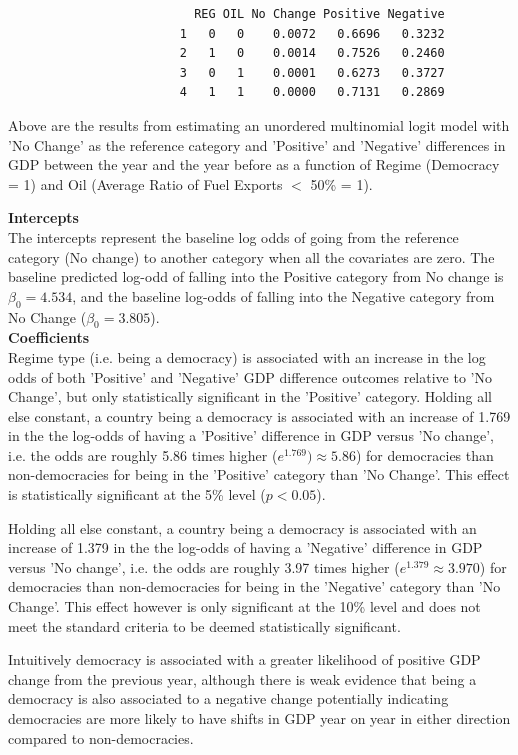 \documentclass[12pt,letterpaper]{article}
\begin{document}
\begin{enumerate}
			
		\begin{verbatim} 
						  REG OIL No Change Positive Negative
						1   0   0    0.0072   0.6696   0.3232
						2   1   0    0.0014   0.7526   0.2460
						3   0   1    0.0001   0.6273   0.3727
						4   1   1    0.0000   0.7131   0.2869
		\end{verbatim}
			
		Above are the results from estimating an unordered multinomial logit model with 'No Change' as the reference category and 'Positive' and 'Negative' differences in GDP between the year and the year before as a function of Regime (Democracy = 1) and Oil (Average Ratio of Fuel Exports $<$ 50\% = 1).
		
		\textbf{Intercepts} \\
		The intercepts represent the baseline log odds of going from the reference category (No change) to another category when all the covariates are zero. The baseline predicted log-odd of falling into the Positive category from No change is $\beta_0 = 4.534$, and the baseline log-odds of falling into the Negative category from No Change ($\beta_0 = 3.805$). \\
		
	
		\textbf{Coefficients} \\
		Regime type (i.e. being a democracy) is associated with an increase in the log odds of both 'Positive' and 'Negative' GDP difference outcomes relative to 'No Change', but only statistically significant in the 'Positive' category.  Holding all else constant, a country being a democracy is associated with an increase of 1.769 in the the log-odds of having a 'Positive' difference in GDP versus 'No change', i.e. the odds are roughly 5.86 times higher ($e^{1.769})\approx5.86$) for democracies than non-democracies for being in the 'Positive' category than 'No Change'. This effect is statistically significant at the 5\% level ($p <0.05$).

		Holding all else constant, a country being a democracy is associated with an increase of 1.379 in the the log-odds of having a 'Negative' difference in GDP versus 'No change', i.e. the odds are roughly 3.97 times higher ($e^{1.379}\approx3.970$) for democracies than non-democracies for being in the 'Negative' category than 'No Change'. This effect however is only significant at the 10\% level and does not meet the standard criteria to be deemed statistically significant. 
		
		Intuitively democracy is associated with a greater likelihood of positive GDP change from the previous year, although there is weak evidence that being a democracy is also associated to a negative change potentially indicating democracies are more likely to have shifts in GDP year on year in either direction compared to non-democracies. \\
		 

\end{enumerate}
\end{document}
